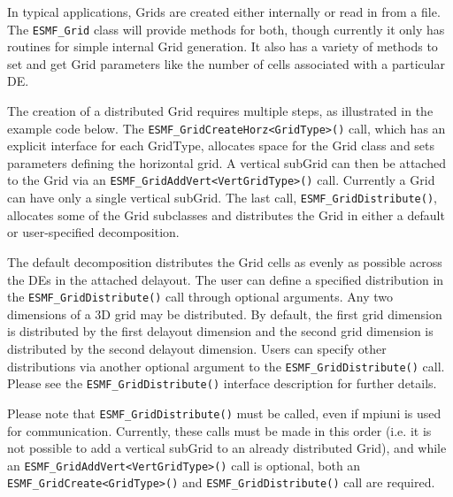 


In typical applications, Grids are created either internally or read in from
a file.  The {\tt ESMF\_Grid} class will provide methods for both, though 
currently it only has routines for simple internal Grid generation.  It also
has a variety of methods to set and get Grid parameters like the number of cells
associated with a particular DE.  

The creation of a distributed Grid requires multiple steps, as
illustrated in the example code below.  The {\tt ESMF\_GridCreateHorz<GridType>()}
call, which has an explicit interface for each GridType, allocates space for the
Grid class and sets parameters defining the horizontal grid.  A vertical subGrid
can then be attached to the Grid via an {\tt ESMF\_GridAddVert<VertGridType>()}
call.  Currently a Grid can have only a single vertical subGrid.  The last call,
{\tt ESMF\_GridDistribute()}, allocates some of the Grid subclasses and
distributes the Grid in either a default or user-specified decomposition.

The default decomposition distributes the Grid cells as evenly as possible across
the DEs in the attached delayout.  The user can define a specified distribution
in the {\tt ESMF\_GridDistribute()} call through optional arguments.  Any two
dimensions of a 3D grid may be distributed.  By default, the first grid
dimension is distributed by the first delayout dimension and the second grid
dimension is distributed by the second delayout dimension.  Users can specify
other distributions via another optional argument to the {\tt ESMF\_GridDistribute()}
call.  Please see the {\tt ESMF\_GridDistribute()} interface description for
further details.

Please note that {\tt ESMF\_GridDistribute()} must be called, even if mpiuni is
used for communication.  Currently, these calls must be made in this order
(i.e. it is not possible to add a vertical subGrid to an already distributed
Grid), and while an {\tt ESMF\_GridAddVert<VertGridType>()} call is optional,
both an {\tt ESMF\_GridCreate<GridType>()} and {\tt ESMF\_GridDistribute()}
call are required.

